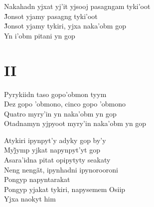 \begin{linenumbers}\begingroup\raggedright
 
\noindent   Nakahadn yjxat yj'it yjsooj pasagngam tyki'oot\\
  J̃onsot yjamy pasagng tyki’oot\\
  J̃onsot yjamy tykiri, yjxa naka’obm gop\\
  Yn i’obm pitani yn gop
 
 
\medskip
\section{II}

  \noindent Pyrykiidn taso gopo'obmon tyym\\
  Dez gopo 'obmono, cinco gopo 'obmono\\
  Quatro myry'in yn naka'obm yn gop\\
  Otadnamyn yjpyoot myry'in naka'obm yn gop
 
\end{linenumbers}\endgroup

\bigskip

\begin{linenumbers}\begingroup\raggedright
 
\noindent   Atykiri ipynpyt'y adyky gop by'y\\
  Myj̃ymp yjkat napynpyt’yt gop\\
  Asara'idna pitat opipytyty seakaty\\
  Neng nengãt, ipynhadni ipynorooroni\\
  Pongyp napyntarakat\\
  Pongyp yjakat tykiri, napysemem Osiip\\
  Yjxa naokyt him
 
\end{linenumbers}\endgroup

